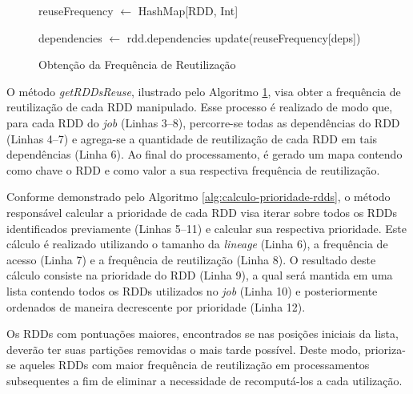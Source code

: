 \begin{figure}[!ht]
    \begin{algorithm}[H]
        \caption{Obtenção da Frequência de Reutilização}
        \label{alg:frequencia-reutilizacao-rdds}
        reuseFrequency $\leftarrow$ HashMap[RDD, Int]\;
        
         {
           
            {
                dependencies $\leftarrow$  rdd.dependencies\;
                 {
                    update(reuseFrequency[deps])\;
                }
           }
        }
    \end{algorithm}
\end{figure}

O método \textit{getRDDsReuse}, ilustrado pelo Algoritmo \ref{alg:frequencia-reutilizacao-rdds}, visa obter a frequência de reutilização de cada RDD manipulado. Esse processo é realizado de modo que, para cada RDD do \textit{job} (Linhas 3--8), percorre-se todas as dependências do RDD (Linhas 4--7) e agrega-se a quantidade de reutilização de cada RDD em tais dependências (Linha 6). Ao final do processamento, é gerado um mapa contendo como chave o RDD e como valor a sua respectiva frequência de reutilização.

Conforme demonstrado pelo Algoritmo \ref{alg:calculo-prioridade-rdds}, o método responsável calcular a prioridade de cada RDD visa iterar sobre todos os RDDs identificados previamente  (Linhas 5--11) e calcular sua respectiva prioridade. Este cálculo é realizado utilizando o tamanho da \textit{lineage} (Linha 6), a frequência de acesso (Linha 7) e a frequência de reutilização (Linha 8). O resultado deste cálculo consiste na prioridade do RDD (Linha 9), a qual será mantida em uma lista contendo todos os RDDs utilizados no \textit{job} (Linha 10) e posteriormente ordenados de maneira decrescente por prioridade (Linha 12).

Os RDDs com pontuações maiores, encontrados se nas posições iniciais da lista, deverão ter suas partições removidas o mais tarde possível. Deste modo, prioriza-se aqueles RDDs com maior frequência de reutilização em processamentos subsequentes a fim de eliminar a necessidade de recomputá-los a cada utilização.

